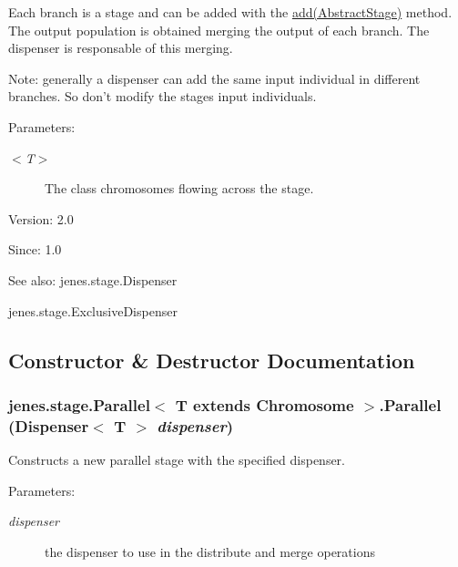 Each branch is a stage and can be added with the \hyperlink{}{add(AbstractStage)} method. The output population is obtained merging the output of each branch. The dispenser is responsable of this merging. 

Note: generally a dispenser can add the same input individual in different branches. So don't modify the stages input individuals. 

\begin{Desc}
\item[Parameters:]
\begin{description}
\item[{\em $<$T$>$}]The class chromosomes flowing across the stage.\end{description}
\end{Desc}
\begin{Desc}
\item[Version:]2.0 \end{Desc}
\begin{Desc}
\item[Since:]1.0\end{Desc}
\begin{Desc}
\item[See also:]jenes.stage.Dispenser 

jenes.stage.ExclusiveDispenser \end{Desc}


\subsection{Constructor \& Destructor Documentation}
\hypertarget{classjenes_1_1stage_1_1_parallel_3_01_t_01extends_01_chromosome_01_4_933c7a845f624f290f27c9921e6e8ca9}{
\subsubsection[Parallel]{\setlength{\rightskip}{0pt plus 5cm}jenes.stage.Parallel$<$ T extends Chromosome $>$.Parallel (Dispenser$<$ T $>$ {\em dispenser})}}
\label{classjenes_1_1stage_1_1_parallel_3_01_t_01extends_01_chromosome_01_4_933c7a845f624f290f27c9921e6e8ca9}


Constructs a new parallel stage with the specified dispenser. 

\begin{Desc}
\item[Parameters:]
\begin{description}
\item[{\em dispenser}]the dispenser to use in the distribute and merge operations \end{description}
\end{Desc}


